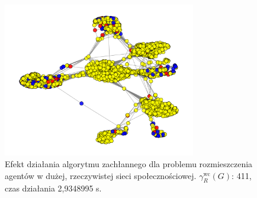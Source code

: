 \begin{figure}[H]
    \centering
    \includegraphics[width=0.75\textwidth]{assets/Facebook/facebookgreedy.png}
    \caption{Efekt działania algorytmu zachłannego dla problemu rozmieszczenia agentów w dużej, rzeczywistej sieci społecznościowej. $\gamma^{\text{wc}}_R(G)$: 411, czas działania 2,9348995 s.}
    \label{fig:fbgreedy}
\end{figure}